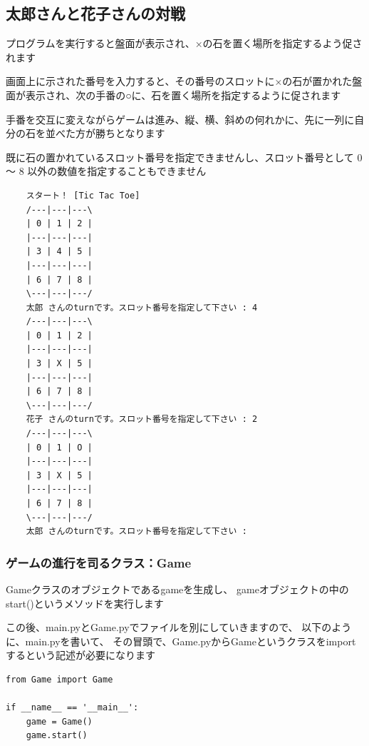 \documentclass[uplatex,a4paper,11pt,oneside,openany]{jsbook}
\begin{document}
\subsection{太郎さんと花子さんの対戦}

プログラムを実行すると盤面が表示され、×の石を置く場所を指定するよう促されます

画面上に示された番号を入力すると、その番号のスロットに×の石が置かれた盤面が表示され、次の手番の○に、石を置く場所を指定するように促されます

手番を交互に変えながらゲームは進み、縦、横、斜めの何れかに、先に一列に自分の石を並べた方が勝ちとなります

既に石の置かれているスロット番号を指定できませんし、スロット番号として 0 〜 8 以外の数値を指定することもできません

\begin{spacing}{0.74}
  \begin{verbatim}
    スタート！ [Tic Tac Toe]
    /---|---|---\
    | 0 | 1 | 2 |
    |---|---|---|
    | 3 | 4 | 5 |
    |---|---|---|
    | 6 | 7 | 8 |
    \---|---|---/
    太郎 さんのturnです。スロット番号を指定して下さい : 4
    /---|---|---\
    | 0 | 1 | 2 |
    |---|---|---|
    | 3 | X | 5 |
    |---|---|---|
    | 6 | 7 | 8 |
    \---|---|---/
    花子 さんのturnです。スロット番号を指定して下さい : 2
    /---|---|---\
    | 0 | 1 | O |
    |---|---|---|
    | 3 | X | 5 |
    |---|---|---|
    | 6 | 7 | 8 |
    \---|---|---/
    太郎 さんのturnです。スロット番号を指定して下さい :
  \end{verbatim}
\end{spacing}

\subsubsection{ゲームの進行を司るクラス：Game}

Gameクラスのオブジェクトであるgameを生成し、
gameオブジェクトの中のstart()というメソッドを実行します

この後、main.pyとGame.pyでファイルを別にしていきますので、
以下のように、main.pyを書いて、
その冒頭で、Game.pyからGameというクラスをimportするという記述が必要になります

\begin{lstlisting}[caption=main.py,label=prog01-3-1]
from Game import Game

if __name__ == '__main__':
    game = Game()
    game.start()
\end{lstlisting}%
\end{document}
